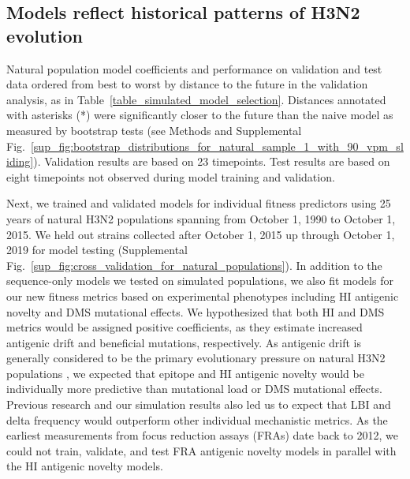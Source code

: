 \subsection*{Models reflect historical patterns of H3N2 evolution}

\begin{table}[htb]
  \begin{center}
    \scalebox{0.9}{
      
    }
    \caption{
      Natural population model coefficients and performance on validation and test data ordered from best to worst by distance to the future in the validation analysis, as in Table~\ref{table_simulated_model_selection}.
      Distances annotated with asterisks (*) were significantly closer to the future than the naive model as measured by bootstrap tests (see Methods and Supplemental Fig.~\ref{sup_fig:bootstrap_distributions_for_natural_sample_1_with_90_vpm_sliding}).
      Validation results are based on 23 timepoints.
      Test results are based on eight timepoints not observed during model training and validation.
    }
    \label{table_natural_model_selection}
  \end{center}
\end{table}

Next, we trained and validated models for individual fitness predictors using 25 years of natural H3N2 populations spanning from October 1, 1990 to October 1, 2015.
We held out strains collected after October 1, 2015 up through October 1, 2019 for model testing (Supplemental Fig.~\ref{sup_fig:cross_validation_for_natural_populations}).
In addition to the sequence-only models we tested on simulated populations, we also fit models for our new fitness metrics based on experimental phenotypes including HI antigenic novelty and DMS mutational effects.
We hypothesized that both HI and DMS metrics would be assigned positive coefficients, as they estimate increased antigenic drift and beneficial mutations, respectively.
As antigenic drift is generally considered to be the primary evolutionary pressure on natural H3N2 populations \cite{Smith:2004jc,Bedford:2014bf,Luksza:2014hj}, we expected that epitope and HI antigenic novelty would be individually more predictive than mutational load or DMS mutational effects.
Previous research \cite{Neher:2014eu} and our simulation results also led us to expect that LBI and delta frequency would outperform other individual mechanistic metrics.
As the earliest measurements from focus reduction assays (FRAs) date back to 2012, we could not train, validate, and test FRA antigenic novelty models in parallel with the HI antigenic novelty models.

